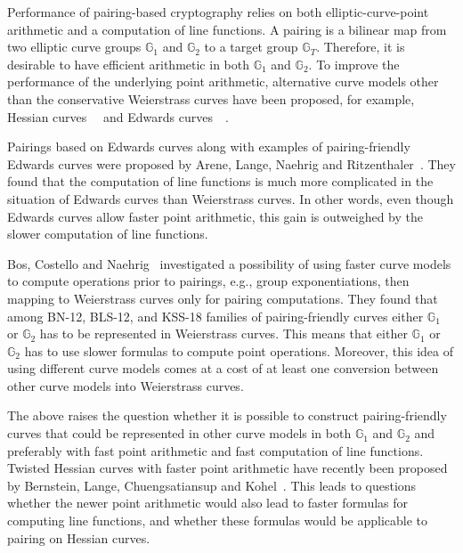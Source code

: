 Performance of pairing-based cryptography relies on both
elliptic-curve-point arithmetic and a computation of line functions.
A pairing is a bilinear map from two elliptic curve groups $\mathbb{G}_1$ and $\mathbb{G}_2$ to
a target group $\mathbb{G}_T$.
Therefore, it is desirable to have efficient arithmetic in both $\mathbb{G}_1$ and $\mathbb{G}_2$.
To improve the performance of the underlying point arithmetic,
alternative curve models other than the conservative Weierstrass curves have been proposed,
for example, Hessian curves~\cite{2001/smart}~\cite{2001/joye} and
Edwards curves~\cite{2007/edwards}~\cite{2007/bernstein-newelliptic}.

Pairings based on Edwards curves
along with examples of pairing-friendly Edwards curves
were proposed by Arene, Lange, Naehrig and Ritzenthaler~\cite{2009/fastertate}.
They found that the computation of line functions is much more complicated in the situation of Edwards curves than Weierstrass curves.
In other words,
even though Edwards curves allow faster point arithmetic,
this gain is outweighed by the slower computation of line functions.

Bos, Costello and Naehrig~\cite{2013/bos-pairing} investigated a possibility of
using faster curve models to compute operations prior to pairings, e.g., group exponentiations,
then mapping to Weierstrass curves only for pairing computations.
They found that among BN-12, BLS-12, and KSS-18 families of pairing-friendly curves
either $\mathbb{G}_1$ or $\mathbb{G}_2$ has to be represented in Weierstrass curves.
This means that either $\mathbb{G}_1$ or $\mathbb{G}_2$ has to use slower formulas to compute point operations.
Moreover, this idea of using different curve models comes at a cost of at least one conversion
between other curve models into Weierstrass curves.

The above raises the question whether it is possible to construct pairing-friendly curves that could be
represented in other curve models in both $\mathbb{G}_1$ and $\mathbb{G}_2$
and preferably with fast point arithmetic and fast computation of line functions.
Twisted Hessian curves with faster point arithmetic have recently been proposed by
Bernstein, Lange, Chuengsatiansup and Kohel~\cite{2015/hessian}.
This leads to questions whether the newer point arithmetic would also lead to faster formulas for computing line functions,
and whether these formulas would be applicable to pairing on Hessian curves.

